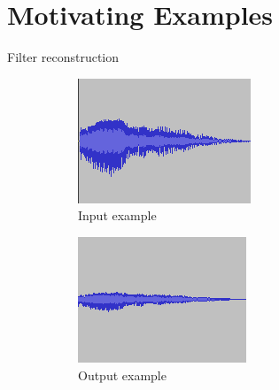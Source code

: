 \section{Motivating Examples}

Filter reconstruction
\begin{figure}
\centering
\begin{subfigure}{.32\linewidth}
  \centering
  \includegraphics[width=.9\textwidth]{figs/original.png}
  \caption{Input example}
  \label{fig:inEx}
\end{subfigure}%
\begin{subfigure}{.32\linewidth}
  \centering
  \includegraphics[width=.9\textwidth]{figs/lpf800.png}
  \caption{Output example}
  \label{fig:outEx}
\end{subfigure}
\begin{subfigure}{.32\linewidth}
  \centering

\end{subfigure}
\end{figure}
